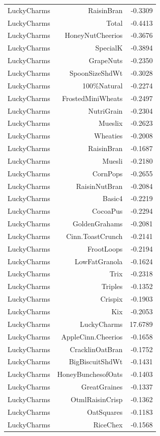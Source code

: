 \begin{longtable}{@{}lrr@{}}
LuckyCharms & RaisinBran & -0.3309 \\
LuckyCharms & Total & -0.4413 \\
LuckyCharms & HoneyNutCheerios & -0.3676 \\
LuckyCharms & SpecialK & -0.3894 \\
LuckyCharms & GrapeNuts & -0.2350 \\
LuckyCharms & SpoonSizeShdWt & -0.3028 \\
LuckyCharms & 100\%Natural & -0.2274 \\
LuckyCharms & FrostedMiniWheats & -0.2497 \\
LuckyCharms & NutriGrain & -0.2304 \\
LuckyCharms & Mueslix & -0.2623 \\
LuckyCharms & Wheaties & -0.2008 \\
LuckyCharms & RaisinBran & -0.1687 \\
LuckyCharms & Muesli & -0.2180 \\
LuckyCharms & CornPops & -0.2655 \\
LuckyCharms & RaisinNutBran & -0.2084 \\
LuckyCharms & Basic4 & -0.2219 \\
LuckyCharms & CocoaPus & -0.2294 \\
LuckyCharms & GoldenGrahams & -0.2081 \\
LuckyCharms & Cinn.ToastCrunch & -0.2141 \\
LuckyCharms & FrootLoops & -0.2194 \\
LuckyCharms & LowFatGranola & -0.1624 \\
LuckyCharms & Trix & -0.2318 \\
LuckyCharms & Triples & -0.1352 \\
LuckyCharms & Crispix & -0.1903 \\
LuckyCharms & Kix & -0.2053 \\
LuckyCharms & LuckyCharms & 17.6789 \\
LuckyCharms & AppleCinn.Cheerios & -0.1658 \\
LuckyCharms & CracklinOatBran & -0.1752 \\
LuckyCharms & BigBiscuitShdWt & -0.1431 \\
LuckyCharms & HoneyBunchesofOats & -0.1403 \\
LuckyCharms & GreatGraines & -0.1337 \\
LuckyCharms & OtmlRaisinCrisp & -0.1362 \\
LuckyCharms & OatSquares & -0.1183 \\
LuckyCharms & RiceChex & -0.1568 \\

\end{longtable}
